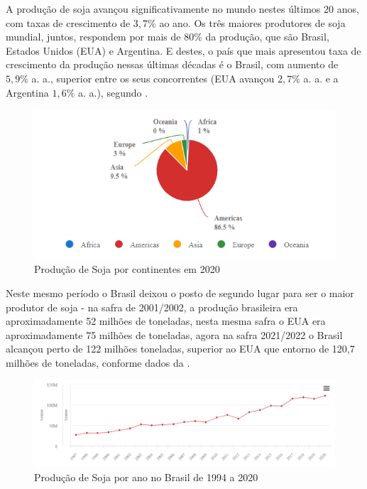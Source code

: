 \documentclass[
	12pt,				%
	openright,			%
	oneside,      %
	a4paper,			%
	english,			%
	french,				%
	spanish,			%
	brazil,				%
	]{abntex2}\usepackage[]{graphicx}\usepackage[]{xcolor}
\begin{document}
A produção de soja avançou significativamente no mundo nestes últimos 20 anos, com taxas 
de crescimento de $3,7\%$ ao ano. Os três maiores produtores de soja mundial, juntos, respondem por mais de $80\%$ da produção, que são Brasil, Estados Unidos (EUA) e Argentina. E destes, o país que mais apresentou taxa de crescimento da produção nessas últimas décadas é o Brasil, com aumento de $5,9\%$ a. a., superior entre os seus concorrentes (EUA avançou $2,7\%$ a. a. e a Argentina $1,6\%$ a. a.), segundo \cite{cepea2022}.

\begin{figure}
  \caption{\label{imagen1}Produção de Soja por continentes em 2020}
    \begin{center}
      \includegraphics[width=12cm]{image/img1.png}
    \end{center}
\end{figure}


Neste mesmo período o Brasil deixou o posto de segundo lugar para ser o maior produtor de soja - na safra de 2001/2002, a produção brasileira era aproximadamente 52 milhões de toneladas, nesta mesma safra o EUA era aproximadamente 75 milhões de toneladas, agora na safra 2021/2022 o Brasil alcançou perto de 122 milhões toneladas, superior ao EUA que entorno de 120,7 milhões de toneladas, conforme dados da \cite{conab2022}.

\begin{figure}
  \caption{\label{imagen2}Produção de Soja por ano no Brasil de 1994 a 2020}
    \begin{center}
      \includegraphics[scale = 0.7]{image/img2.png}
    \end{center}
\end{figure}
\end{document}
